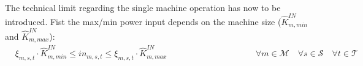 \documentclass{article}
\newcommand{\cT}{{\mathcal T}}
\newcommand{\cM}{{\mathcal M}}
\newcommand{\cQ}{{\mathcal Q}}
\newcommand{\cC}{{\mathcal C}}
\newcommand{\cF}{{\mathcal F}}
\newcommand{\cS}{{\mathcal S}}
\begin{document}
{\begin{align}
\begin{split}
		\end{split}		
		\end{align}
		\begin{comment}
		\begin{align}
		& q_{m,s,t}^{gen} = \xi_{m,s,t} \cdot \left( \hat{K}_{m,0}^{IN} \cdot \hat{K}_{m}^{1Q} + \hat{K}_{m}^{2Q} \right) + \sum_{v \geq 1} \beta_{m,s,t,v} \cdot (\hat{K}_{m,v}^{IN} - \hat{K}_{m,0}^{IN}) \cdot \hat{K}_{m}^{1Q} + \hat{K}_{m}^{3Q} \cdot z_{m,s,t} &\forall m \in \cQ^+ \quad \forall s \in \cS \quad \forall t \in \cT \label{eq:heat_gen}\\
		& c_{m,s,t}^{gen} = \xi_{m,s,t} \cdot \left( \hat{K}_{m,0}^{IN} \cdot \hat{K}_{m}^{1C} + \hat{K}_{m}^{2C} \right) + \sum_{v \geq 1} \beta_{m,s,t,v} \cdot (\hat{K}_{m,v}^{IN} - \hat{K}_{m,0}^{IN}) \cdot \hat{K}_{m}^{1C} + \hat{K}_{m}^{3C} \cdot z_{m,s,t} &\forall m \in \cC^+ \quad \forall s \in \cS \quad \forall t \in \cT \label{eq:cold_gen}
		\end{align}	
		\end{comment}			
The technical limit regarding the single machine operation has now to be introduced. Fist the max/min power input depends on the machine size ($\hat{K}_{m,min}^{IN}$ and $\hat{K}_{m,max}^{IN}$):
		\begin{align}
	& \xi_{m,s,t} \cdot \hat{K}_{m,min}^{IN} \leq in_{m,s,t} \leq \xi_{m,s,t} \cdot \hat{K}_{m,max}^{IN} & \hspace{4cm} \forall m \in \cM \quad \forall s \in \cS \quad \forall t \in \cT \label{eq:In_lim}
		\end{align}
		\begin{comment}
		\begin{align}
	& f_{m,s,t} \geq \xi_{m,s,t} \cdot \hat{K}_{m,min}^{IN} & \hspace{7cm} \forall m \in \cF \quad \forall s \in \cS \quad \forall t \in \cT \label{eq:Min_fuel}\\
	& f_{m,s,t} \leq \xi_{m,s,t} \cdot \hat{K}_{m,max}^{IN} &\forall m \in \cF \quad \forall s \in \cS \quad \forall t \in \cT \label{eq:Max_fuel}\\
	& el_{m,s,t}^{cons} \geq \xi_{m,s,t} \cdot \hat{K}_{m,min}^{IN} & \forall m \in \cF \quad \forall s \in \cS \quad \forall t \in \cT \label{eq:Min_el}\\
	& el_{m,s,t}^{cons} \leq \xi_{m,s,t} \cdot \hat{K}_{m,max}^{IN} & \forall m \in \cF \quad \forall s \in \cS \quad \forall t \in \cT \label{eq:Max_el}
		\end{align}
		\end{comment}
}
\end{document}
